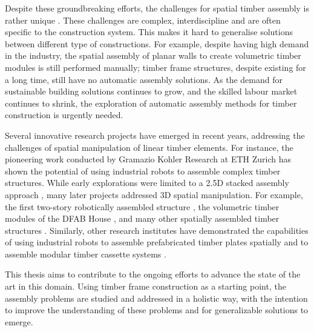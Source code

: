 Despite these groundbreaking efforts, the challenges for spatial timber assembly is rather unique . These challenges are complex, interdiscipline and are often specific to the construction system. This makes it hard to generalise solutions between different type of constructions. For example, despite having high demand in the industry, the spatial assembly of planar walls to create volumetric timber modules is still performed manually; timber frame structures, despite existing for a long time, still have no automatic assembly solutions. As the demand for sustainable building solutions continues to grow, and the skilled labour market continues to shrink, the exploration of automatic assembly methods for timber construction is urgently needed. 

Several innovative research projects have emerged in recent years, addressing the challenges of spatial manipulation of linear timber elements. For instance, the pioneering work conducted by Gramazio Kohler Research at ETH Zurich has shown the potential of using industrial robots to assemble complex timber structures. While early explorations were limited to a 2.5D stacked assembly approach \parencite{apolinarskaSequentialRoof2016, gramaziokohlerresearchethzurichStackedPavilion2009, helmInSituFabricationMobile2014}, many later projects addressed 3D spatial manipulation. For example, the first two-story robotically assembled structure \parencite{eversmannRoboticPrefabricationTimber2017}, the volumetric timber modules of the DFAB House \parencite{adelDesignRoboticallyFabricated2018, thomaRoboticFabricationBespoke2018}, and many other spatially assembled timber structures \parencite{apolinarskaRoboticAssemblyTimber2021, eversmannRoboticPrefabricationTimber2017, helmAdditiveRoboticFabrication2016, helmreichRoboticAssemblyModular2022,willmannNewParadigmsAutomatic2016}. Similarly, other research institutes have demonstrated the capabilities of using industrial robots to assemble prefabricated timber plates spatially \parencite{robellerRoboticIntegralAttachment2017, rogeauRoboticAssemblyIntegrallyAttached2023} and to assemble modular timber cassette systems \parencite{alvarezBUGAWoodPavilion2019, claypoolAutomationDiscreteExploring2021}.

This thesis aims to contribute to the ongoing efforts to advance the state of the art in this domain. Using timber frame construction as a starting point, the assembly problems are studied and addressed in a holistic way, with the intention to improve the understanding of these problems and for generalizable solutions to emerge.

